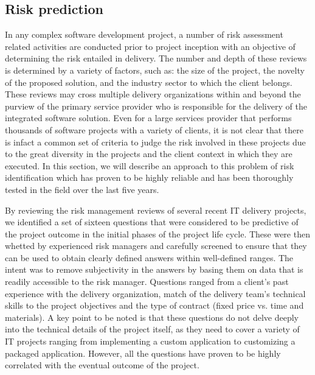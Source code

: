 \subsection{Risk prediction}
 In any complex software development project, a number of risk assessment related activities are conducted prior to project inception with an objective of determining the risk entailed in delivery. The number and depth of these reviews is determined by a variety of factors, such as: the size of the project, the novelty of the proposed solution, and the industry sector to which the client belongs. These reviews may cross multiple delivery organizations within and beyond the purview of the primary service provider who is responsible for the delivery of the integrated software solution. Even for a large services provider that performs thousands of software projects with a variety of clients, it is not clear that there is infact a common set of criteria to judge the risk involved in these projects due to the great diversity in the projects and the client context in which they are executed. In this section, we will describe an approach to this problem of risk identification which has proven to be highly reliable and has been thoroughly tested in the field over the last five years.

 By reviewing the risk management reviews of several recent IT delivery projects, we identified a set of sixteen questions that were considered to be predictive of the project outcome in the initial phases of the project life cycle. These were then whetted by experienced risk managers and carefully screened to ensure that they can be used to obtain clearly defined answers within well-defined ranges. The intent was to remove subjectivity in the answers by basing them on data that is readily accessible to the risk manager.  Questions ranged from a client's past experience with the delivery organization, match of the delivery team’s technical skills to the project objectives and the type of contract (fixed price vs. time and materials).  A key point to be noted is that these questions do not delve deeply into the technical details of the project itself, as they need to cover a variety of IT projects ranging from implementing a custom application to customizing a packaged application. However, all the questions have proven to be highly correlated with the eventual outcome of the project.

